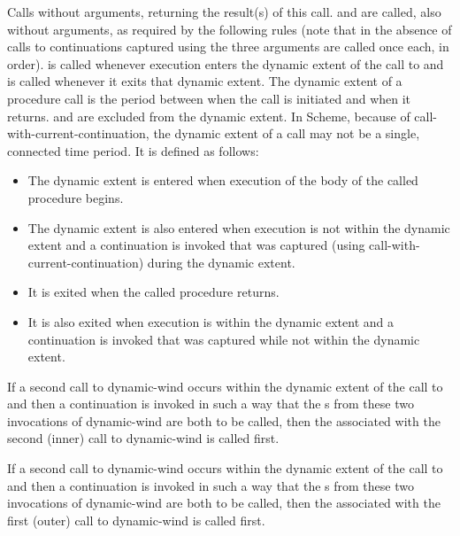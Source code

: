 \begin{entry}{%
}

Calls  without arguments, returning the result(s) of this call.
 and  are called, also without arguments, as required
by the following rules (note that in the absence of calls to continuations
captured using  the three arguments are
called once each, in order).   is called whenever execution
enters the dynamic extent of the call to  and  is called
whenever it exits that dynamic extent.  The dynamic extent of a procedure
call is the period between when the call is initiated and when it
returns.   and  are excluded from the dynamic extent.
In Scheme, because of {\cf call-with-current-continuation}, the
dynamic extent of a call may not be a single, connected time period.
It is defined as follows:
\begin{itemize}
\item The dynamic extent is entered when execution of the body of the
called procedure begins.

\item The dynamic extent is also entered when execution is not within
the dynamic extent and a continuation is invoked that was captured
(using {\cf call-with-current-continuation}) during the dynamic extent.

\item It is exited when the called procedure returns.

\item It is also exited when execution is within the dynamic extent and
a continuation is invoked that was captured while not within the
dynamic extent.
\end{itemize}

If a second call to {\cf dynamic-wind} occurs within the dynamic extent of the
call to  and then a continuation is invoked in such a way that the
s from these two invocations of {\cf dynamic-wind} are both to be
called, then the  associated with the second (inner) call to
{\cf dynamic-wind} is called first.

If a second call to {\cf dynamic-wind} occurs within the dynamic extent of the
call to  and then a continuation is invoked in such a way that the
s from these two invocations of {\cf dynamic-wind} are both to be
called, then the  associated with the first (outer) call to
{\cf dynamic-wind} is called first.


\end{entry}

